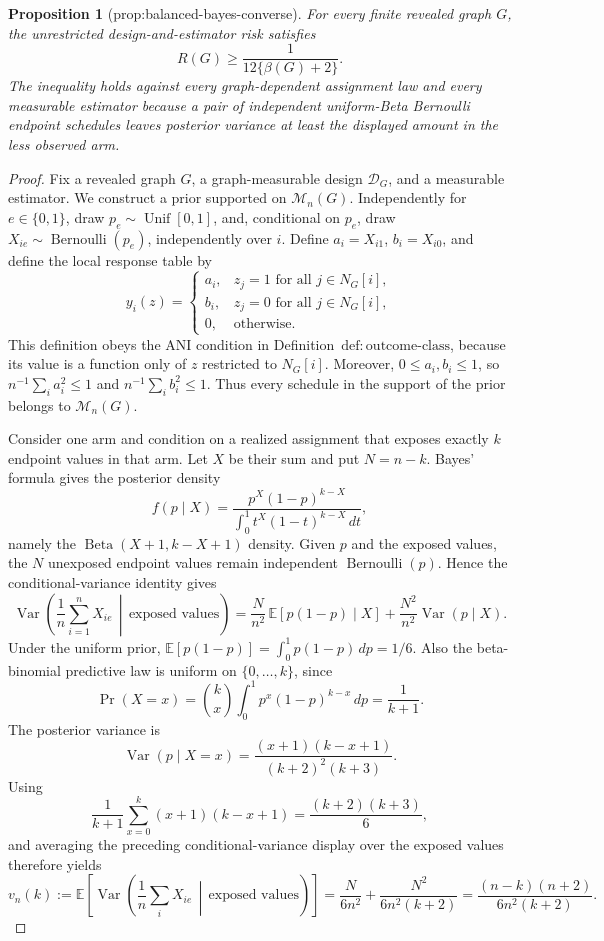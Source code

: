 \documentclass{article}
\newtheorem{proposition}{Proposition}
\begin{document}
\begin{proposition}[prop:balanced-bayes-converse]\label{prop:balanced-bayes-converse}
For every finite revealed graph \(G\), the unrestricted design-and-estimator risk satisfies \[R(G)\ge\frac{1}{12\{\beta(G)+2\}}.\] The inequality holds against every graph-dependent assignment law and every measurable estimator because a pair of independent uniform-Beta Bernoulli endpoint schedules leaves posterior variance at least the displayed amount in the less observed arm.
\end{proposition}
\begin{proof}
Fix a revealed graph \(G\), a graph-measurable design \(\mathcal D_G\), and a measurable estimator.  We construct a prior supported on \(\mathcal M_n(G)\).  Independently for \(e\in\{0,1\}\), draw \(p_e\sim\operatorname{Unif}[0,1]\), and, conditional on \(p_e\), draw \(X_{ie}\sim\operatorname{Bernoulli}(p_e)\), independently over \(i\).  Define \(a_i=X_{i1}\), \(b_i=X_{i0}\), and define the local response table by
\[
y_i(z)=
\begin{cases}
a_i,&z_j=1\text{ for all }j\in N_G[i],\\
b_i,&z_j=0\text{ for all }j\in N_G[i],\\
0,&\text{otherwise}.
\end{cases}
\]
This definition obeys the ANI condition in Definition~\(\mathrm{def{:}outcome\mbox{-}class}\), because its value is a function only of \(z\) restricted to \(N_G[i]\).  Moreover, \(0\le a_i,b_i\le1\), so \(n^{-1}\sum_i a_i^2\le1\) and \(n^{-1}\sum_i b_i^2\le1\).  Thus every schedule in the support of the prior belongs to \(\mathcal M_n(G)\).

Consider one arm and condition on a realized assignment that exposes exactly \(k\) endpoint values in that arm.  Let \(X\) be their sum and put \(N=n-k\).  Bayes' formula gives the posterior density
\[
f(p\mid X)=\frac{p^X(1-p)^{k-X}}{\int_0^1t^X(1-t)^{k-X}\,dt},
\]
namely the \(\operatorname{Beta}(X+1,k-X+1)\) density.  Given \(p\) and the exposed values, the \(N\) unexposed endpoint values remain independent \(\operatorname{Bernoulli}(p)\).  Hence the conditional-variance identity gives
\[
\operatorname{Var}\!\left(\frac1n\sum_{i=1}^nX_{ie}\,\middle|\,\text{exposed values}\right)
=\frac{N}{n^2}\,\mathbb E[p(1-p)\mid X]
+\frac{N^2}{n^2}\operatorname{Var}(p\mid X).
\]
Under the uniform prior, \(\mathbb E[p(1-p)]=\int_0^1p(1-p)\,dp=1/6\).  Also the beta-binomial predictive law is uniform on \(\{0,\ldots,k\}\), since
\[
\Pr(X=x)=\binom{k}{x}\int_0^1p^x(1-p)^{k-x}\,dp=\frac1{k+1}.
\]
The posterior variance is
\[
\operatorname{Var}(p\mid X=x)
=\frac{(x+1)(k-x+1)}{(k+2)^2(k+3)}.
\]
Using
\[
\frac1{k+1}\sum_{x=0}^k(x+1)(k-x+1)=\frac{(k+2)(k+3)}6,
\]
and averaging the preceding conditional-variance display over the exposed values therefore yields
\[
v_n(k):=\mathbb E\!\left[\operatorname{Var}\!\left(\frac1n\sum_iX_{ie}\,\middle|\,\text{exposed values}\right)\right]
=\frac{N}{6n^2}+\frac{N^2}{6n^2(k+2)}
=\frac{(n-k)(n+2)}{6n^2(k+2)}.
\]


\end{proof}
\end{document}
